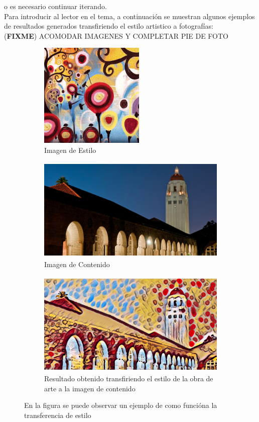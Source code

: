 \documentclass[a4paper,11pt,spanish]{book}
\newcommand*{\FIXME}[1]{{(\textbf{FIXME}) {#1}}}
\begin{document}
    o es necesario continuar iterando. \\
    Para introducir al lector en el tema, a continuación se muestran algunos ejemplos de resultados generados transfiriendo el estilo artistico a fotografías:\\
    \FIXME{ACOMODAR IMAGENES Y COMPLETAR PIE DE FOTO}
    \begin{figure}[h]
 
      \begin{subfigure}{0.7\textwidth}
	\includegraphics[width=0.9\linewidth, height=5cm]{./img/jhonson_style_candy.jpg} 
	\caption{Imagen de Estilo}
	\label{fig:candy}
      \end{subfigure}
    
      \begin{subfigure}{0.7\textwidth}
	\includegraphics[width=0.9\linewidth, height=5cm]{./img/jhonson_content_tower.jpg}
	\caption{Imagen de Contenido}
	\label{fig:tower}
      \end{subfigure}

      \begin{subfigure}{0.7\textwidth}
	\includegraphics[width=0.9\linewidth, height=5cm]{./img/jhonson_result_tower_candy.jpg}
	\caption{Resultado obtenido transfiriendo el estilo de la obra de arte a la imagen de contenido}
	\label{fig:candy_tower}
      \end{subfigure}
    \caption{En la figura se puede observar un ejemplo de como funcióna la transferencia de estilo}
    \label{fig:style_transfer_candy_tower}
    \end{figure}
  
\end{document}
